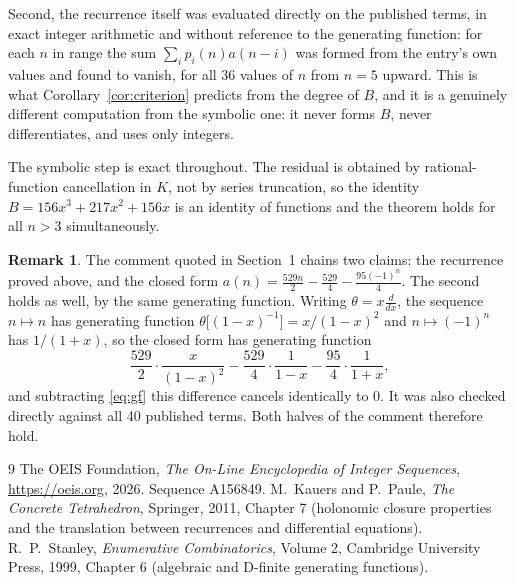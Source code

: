 \documentclass[11pt,a4paper]{article}
\theoremstyle{plain}
\theoremstyle{definition}
\newtheorem{remark}[theorem]{Remark}
\begin{document}
Second, the recurrence itself was evaluated directly on the published terms, in exact
integer arithmetic and without reference to the generating function: for each $n$ in range
the sum $\sum_{i}p_{i}(n)a(n-i)$ was formed from the entry's own values and found to
vanish, for all 36 values of $n$ from $n=5$ upward. This is what
Corollary~\ref{cor:criterion} predicts from the degree of $B$, and it is a genuinely
different computation from the symbolic one: it never forms $B$, never differentiates, and
uses only integers.

The symbolic step is exact throughout. The residual is obtained by rational-function
cancellation in $K$, not by series truncation, so the identity $B=156 x^{3} + 217 x^{2} + 156 x$ is an
identity of functions and the theorem holds for all $n>3$ simultaneously.

\begin{remark}
The comment quoted in Section~1 chains two claims: the recurrence proved above, and the
closed form $a(n)=\tfrac{529n}{2}-\tfrac{529}{4}-\tfrac{95(-1)^{n}}{4}$. The second holds
as well, by the same generating function. Writing $\theta=x\frac{d}{dx}$, the sequence
$n\mapsto n$ has generating function $\theta\bigl[(1-x)^{-1}\bigr]=x/(1-x)^{2}$ and
$n\mapsto(-1)^{n}$ has $1/(1+x)$, so the closed form has generating function
\[
\frac{529}{2}\cdot\frac{x}{(1-x)^{2}}-\frac{529}{4}\cdot\frac{1}{1-x}
-\frac{95}{4}\cdot\frac{1}{1+x},
\]
and subtracting \eqref{eq:gf} this difference cancels identically to $0$. It was also
checked directly against all 40 published terms. Both halves of the comment therefore
hold.
\end{remark}

\begin{thebibliography}{9}
 The OEIS Foundation, \emph{The On-Line Encyclopedia of Integer Sequences},
\url{https://oeis.org}, 2026. Sequence A156849.
 M.~Kauers and P.~Paule, \emph{The Concrete Tetrahedron}, Springer, 2011,
Chapter 7 (holonomic closure properties and the translation between recurrences and
differential equations).
 R.~P.~Stanley, \emph{Enumerative Combinatorics}, Volume 2, Cambridge
University Press, 1999, Chapter 6 (algebraic and D-finite generating functions).
\end{thebibliography}
\end{document}
